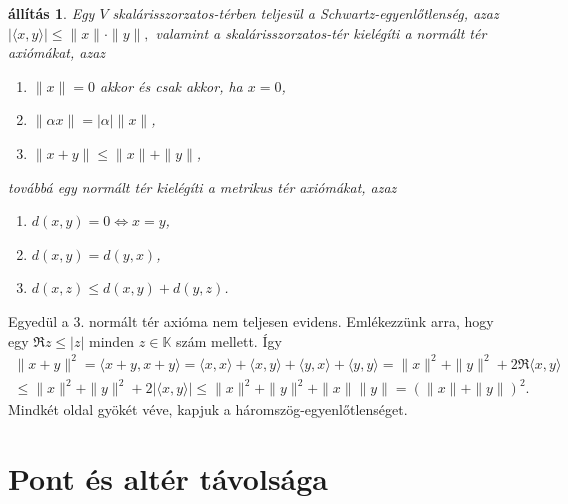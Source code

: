 \documentclass[9pt, a4paper, showtrims]{memoir}
\makeatletter
\renewenvironment{proof}[1][\proofname]
    {\par\pushQED{\qed}%
    \normalfont \topsep6\p@\@plus6\p@\relax
    \trivlist
    \item[\hskip\labelsep
        \itshape
    #1\@addpunct{:}]\ignorespaces}
    {\popQED\endtrivlist\@endpefalse}
\theoremstyle{plain}
\newtheorem{proposition}{állítás}[chapter]
\theoremstyle{remark}
\theoremstyle{definition}
\newcommand{\ip}[2]{\langle#1,#2\rangle}
\makeatother
\begin{document}
\begin{proposition}
    Egy $V$ skalárisszorzatos-térben teljesül a \emph{Schwartz-egyenlőtlenség}, azaz 
    \(|\ip{x}{y}|\leq\|x\|\cdot\|y\|,\) 
    valamint a skalárisszorzatos-tér kielégíti a \emph{normált tér} axiómákat, azaz
    \begin{enumerate}
        \item $\|x\|=0$ akkor és csak akkor, ha $x=0$,
        \item $\|\alpha x\|=|\alpha|\|x\|$,
        \item $\|x+y\|\leq\|x\|+\|y\|$,
    \end{enumerate}
    továbbá egy normált tér kielégíti a \emph{metrikus tér} axiómákat, azaz
    \begin{enumerate}
        \item $d\left( x,y \right)=0\iff x=y$,
        \item $d\left( x,y \right)=d\left( y,x \right)$,
        \item $d\left( x,z \right)\leq d\left( x,y \right)+d\left( y,z \right)$.
            \qedhere
    \end{enumerate}
\end{proposition}
\begin{proof}
    Egyedül a 3. normált tér axióma nem teljesen evidens.
    Emlékezzünk arra, hogy egy $\Re z\leq |z|$ minden $z\in\mathbb{K}$ szám mellett.
    Így
    \begin{multline*}
        \|x+y\|^2
        =
        \ip{x+y}{x+y}
        =
        \ip{x}{x}+\ip{x}{y}+\ip{y}{x}+\ip{y}{y}
        =\|x\|^2+\|y\|^2+2\Re\ip{x}{y}
        \\
        \leq
        \|x\|^2+\|y\|^2+2|\ip{x}{y}|
        \leq
        \|x\|^2+\|y\|^2+\|x\|\|y\|
        =\left( \|x\|+\|y\| \right)^2.
    \end{multline*}
    Mindkét oldal gyökét véve, kapjuk a háromszög-egyenlőtlenséget.
\end{proof}

\section{Pont és altér távolsága}
\end{document}
